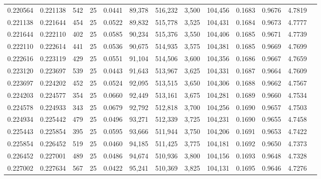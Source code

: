 \begin{tabular}{rrrrrrrrrrrrr}
0.220564 & 0.221138 &   542 &  25 &                                     0.0441 &  89,378 & 516,232 &   3,500 & 104,456 & 0.1683 & 0.9676 & 4.7819 \\
0.221138 & 0.221644 &   454 &  25 &                                     0.0522 &  89,832 & 515,778 &   3,525 & 104,431 & 0.1684 & 0.9673 & 4.7777 \\
0.221644 & 0.222110 &   402 &  25 &                                     0.0585 &  90,234 & 515,376 &   3,550 & 104,406 & 0.1685 & 0.9671 & 4.7739 \\
0.222110 & 0.222614 &   441 &  25 &                                     0.0536 &  90,675 & 514,935 &   3,575 & 104,381 & 0.1685 & 0.9669 & 4.7699 \\
0.222616 & 0.223119 &   429 &  25 &                                     0.0551 &  91,104 & 514,506 &   3,600 & 104,356 & 0.1686 & 0.9667 & 4.7659 \\
0.223120 & 0.223697 &   539 &  25 &                                     0.0443 &  91,643 & 513,967 &   3,625 & 104,331 & 0.1687 & 0.9664 & 4.7609 \\
0.223697 & 0.224202 &   452 &  25 &                                     0.0524 &  92,095 & 513,515 &   3,650 & 104,306 & 0.1688 & 0.9662 & 4.7567 \\
0.224203 & 0.224577 &   354 &  25 &                                     0.0660 &  92,449 & 513,161 &   3,675 & 104,281 & 0.1689 & 0.9660 & 4.7534 \\
0.224578 & 0.224933 &   343 &  25 &                                     0.0679 &  92,792 & 512,818 &   3,700 & 104,256 & 0.1690 & 0.9657 & 4.7503 \\
0.224934 & 0.225442 &   479 &  25 &                                     0.0496 &  93,271 & 512,339 &   3,725 & 104,231 & 0.1690 & 0.9655 & 4.7458 \\
0.225443 & 0.225854 &   395 &  25 &                                     0.0595 &  93,666 & 511,944 &   3,750 & 104,206 & 0.1691 & 0.9653 & 4.7422 \\
0.225854 & 0.226452 &   519 &  25 &                                     0.0460 &  94,185 & 511,425 &   3,775 & 104,181 & 0.1692 & 0.9650 & 4.7373 \\
0.226452 & 0.227001 &   489 &  25 &                                     0.0486 &  94,674 & 510,936 &   3,800 & 104,156 & 0.1693 & 0.9648 & 4.7328 \\
0.227002 & 0.227634 &   567 &  25 &                                     0.0422 &  95,241 & 510,369 &   3,825 & 104,131 & 0.1695 & 0.9646 & 4.7276 \\

\end{tabular}
